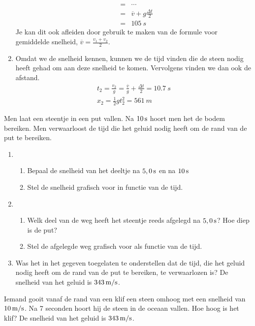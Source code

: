 \begin{exercise}
\begin{oplossing}
\begin{enumerate}
\begin{eqnarray*}
&=&\cdots\\
&=&\overline{v}+g\frac{\Delta t}{2}\\
&=&\SI{105}{s}
\end{eqnarray*}
Je kan dit ook afleiden door gebruik te maken van de formule voor gemiddelde snelheid, $\overline{v}=\frac{v_1+v_2}{2}$.
\item Omdat we de snelheid kennen, kunnen we de tijd vinden die de steen nodig heeft gehad om aan deze snelheid te komen. Vervolgens vinden we dan ook de afstand.
\begin{eqnarray*}
t_2=\frac{v_2}{g}=\frac{\overline{v}}{g}+\frac{\Delta t}{2}=\SI{10,7}{s}\\
x_2=\frac{1}{2}gt_2^2=\SI{561}{m}
\end{eqnarray*}
\end{enumerate}
\end{oplossing}



\end{exercise}

\begin{exercise} Men laat een steentje in een put vallen. Na $10\rm\,s$ hoort
men het de bodem bereiken. Men verwaarloost de tijd die het geluid
nodig heeft om de rand van de put te bereiken.
\begin{enumerate}
\item
\begin{enumerate}
\item Bepaal de snelheid van het deeltje na $5,0\rm\,s$ en na $10\rm\,s$
\item Stel de snelheid grafisch voor in functie van de tijd.
\end{enumerate}
\item
\begin{enumerate}
\item Welk deel van de weg heeft het steentje reeds afgelegd na
$5,0\rm\,s$? Hoe diep is de put?
\item Stel de afgelegde weg grafisch voor als functie van de tijd.
\end{enumerate}
\item Was het in het gegeven toegelaten te onderstellen dat de tijd,
die het geluid nodig heeft om de rand van de put te bereiken, te
verwaarlozen is? De snelheid van het geluid is $343\rm\,m/s$.
\end{enumerate}

\end{exercise}

\begin{exercise} Iemand gooit vanaf de rand van een klif een steen omhoog met
een snelheid van $10\rm\,m/s$. Na 7 seconden hoort hij de steen in
de oceaan vallen. Hoe hoog is het klif? De snelheid van het geluid
is $343\rm\,m/s$.

\end{exercise}

